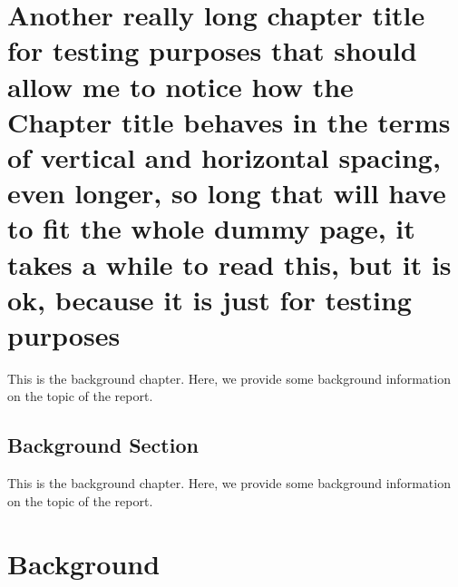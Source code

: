 \documentclass{report}
\begin{document}

\chapter{Another really long chapter title for testing purposes that should allow me to notice how the Chapter title behaves in the terms of vertical and horizontal spacing, even longer, so long that will have to fit the whole dummy page, it takes a while to read this, but it is ok, because it is just for testing purposes}
This is the background chapter. Here, we provide some background information on
the topic of the report.
\section{Background Section}

This is the background chapter. Here, we provide some background information on
the topic of the report.

\chapter{Background}
\lipsum[1-2]
\end{document}
